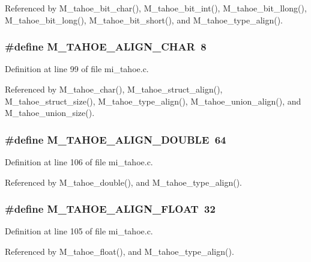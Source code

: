 Referenced by M\_\-tahoe\_\-bit\_\-char(), M\_\-tahoe\_\-bit\_\-int(), M\_\-tahoe\_\-bit\_\-llong(), M\_\-tahoe\_\-bit\_\-long(), M\_\-tahoe\_\-bit\_\-short(), and M\_\-tahoe\_\-type\_\-align().
\subsubsection{\setlength{\rightskip}{0pt plus 5cm}\#define M\_\-TAHOE\_\-ALIGN\_\-CHAR~8}\label{mi__tahoe_8c_2c612a6fac9fa9f6a933b0494dbe92a4}




Definition at line 99 of file mi\_\-tahoe.c.

Referenced by M\_\-tahoe\_\-char(), M\_\-tahoe\_\-struct\_\-align(), M\_\-tahoe\_\-struct\_\-size(), M\_\-tahoe\_\-type\_\-align(), M\_\-tahoe\_\-union\_\-align(), and M\_\-tahoe\_\-union\_\-size().
\subsubsection{\setlength{\rightskip}{0pt plus 5cm}\#define M\_\-TAHOE\_\-ALIGN\_\-DOUBLE~64}\label{mi__tahoe_8c_42c5aa197806b27fcee176ff90a1619d}




Definition at line 106 of file mi\_\-tahoe.c.

Referenced by M\_\-tahoe\_\-double(), and M\_\-tahoe\_\-type\_\-align().
\subsubsection{\setlength{\rightskip}{0pt plus 5cm}\#define M\_\-TAHOE\_\-ALIGN\_\-FLOAT~32}\label{mi__tahoe_8c_7d6816efb80675b1b093f88960b5615f}




Definition at line 105 of file mi\_\-tahoe.c.

Referenced by M\_\-tahoe\_\-float(), and M\_\-tahoe\_\-type\_\-align().
